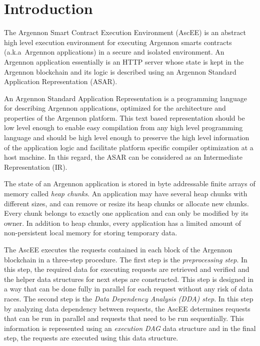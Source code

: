 

\section{Introduction}\label{sec:introduction}

The Argennon Smart Contract Execution Environment (AscEE) is an abstract high level execution environment for executing
Argennon smarts contracts (a.k.a\ Argennon applications) in a secure and isolated environment. An Argennon application
essentially is an HTTP server whose state is
kept in the Argennon blockchain and its logic is described using an Argennon Standard Application Representation (ASAR).

An Argennon Standard Application Representation is a programming language for describing Argennon
applications, optimized
for the architecture and properties of the Argennon platform. This text based representation should be low level
enough to enable easy compilation from any high level programming language and should be high level enough to preserve
the high level information of the application logic and facilitate platform specific compiler optimization at a host
machine. In this regard, the ASAR can be considered as an Intermediate Representation (IR).

The state of an Argennon application is stored in byte addressable finite arrays of memory called
\emph{heap chunks}. An application may have several heap chunks with different sizes, and can remove or
resize its heap chunks or allocate new chunks. Every chunk belongs to exactly one application and can only be modified
by its owner. In addition to heap chunks, every application has a limited amount of non-persistent local memory for
storing temporary data.

The AscEE executes the requests contained in each block of the Argennon
blockchain in a three-step procedure. The first step is the \emph{preprocessing step}. In this step, the required
data for executing requests are retrieved and verified and the
helper data structures for next steps are constructed. This step is
designed in a way that can be done fully in parallel for each request without any risk of data races. The second
step is the \emph{Data Dependency Analysis (DDA) step}.
In this step by analyzing data dependency between requests, the AscEE determines requests that can be run in parallel
and requests that need to be run sequentially. This information is represented using an \emph{execution DAG} data
structure and in the final step, the requests are executed using this data structure.


